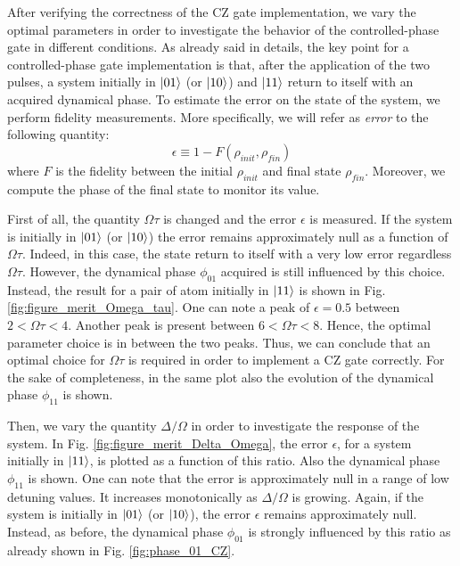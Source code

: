 \documentclass[rmp,10pt,onecolumn,fleqn,notitlepage]{revtex4-1}
\begin{document}
After verifying the correctness of the CZ gate implementation, we vary the optimal parameters in order to investigate the behavior of the controlled-phase gate in different conditions.
As already said in details, the key point for a controlled-phase gate implementation is that, after the application of the two pulses, a system initially in $\left\vert{01}\right\rangle$ (or $\left\vert{10}\right\rangle$) and $\left\vert{11}\right\rangle$ return to itself with an acquired dynamical phase. To estimate the error on the state of the system, we perform fidelity measurements. More specifically, we will refer as \textit{error} to the following quantity:
\begin{equation}
    \epsilon \equiv 1 - F(\rho_{init},\rho_{fin})
    \label{eq:epsilon_fidelity}
\end{equation}
where $F$ is the fidelity between the initial $\rho_{init}$ and final state $\rho_{fin}$.
Moreover, we compute the phase of the final state to monitor its value. 

First of all, the quantity $\Omega \tau$ is changed and the error $\epsilon$ is measured. 
If the system is initially in $\left\vert{01}\right\rangle$ (or $\left\vert{10}\right\rangle$) the error remains approximately null as a function of $\Omega \tau$.
Indeed, in this case, the state return to itself with a very low error regardless $\Omega\tau$. However, the dynamical phase $\phi_{01}$ acquired is still influenced by this choice. Instead, the result for a pair of atom initially in $\left\vert{11}\right\rangle$ is shown in Fig. \ref{fig:figure_merit_Omega_tau}. One can note a peak of $\epsilon=0.5$ between $2<\Omega \tau<4$. Another peak is present between $6<\Omega \tau<8$. Hence, the optimal parameter choice is in between the two peaks. Thus, we can conclude that an optimal choice for $\Omega \tau$ is required in order to implement a CZ gate correctly.
For the sake of completeness, in the same plot also the evolution of the dynamical phase $\phi_{11}$ is shown. 

Then, we vary the quantity $\Delta/\Omega$ in order to investigate the response of the system. In Fig. \ref{fig:figure_merit_Delta_Omega}, the error $\epsilon$, for a system initially in $\left\vert{11}\right\rangle$, is plotted as a function of this ratio. Also the dynamical phase $\phi_{11}$ is shown. One can note that the error is approximately null in a range of low detuning values. It increases monotonically as $\Delta/\Omega$ is growing.  
Again, if the system is initially in $\left\vert{01}\right\rangle$ (or $\left\vert{10}\right\rangle$), the error $\epsilon$ remains approximately null. Instead, as before, the dynamical phase $\phi_{01}$ is strongly influenced by this ratio as already shown in Fig. \ref{fig:phase_01_CZ}.
\end{document}
